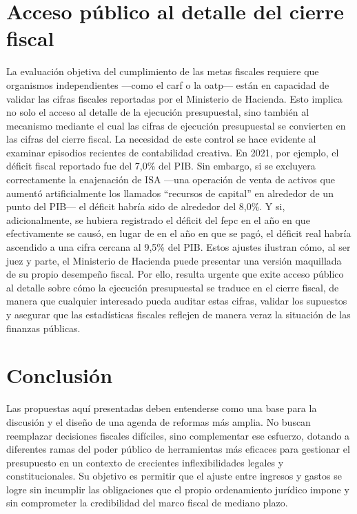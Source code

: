 \section{Acceso público al detalle del cierre fiscal}

La evaluación objetiva del cumplimiento de las metas fiscales requiere que organismos independientes —como el \gls{carf} o la \gls{oatp}— están en capacidad de validar las cifras fiscales reportadas por el Ministerio de Hacienda. Esto implica no solo el acceso al detalle de la ejecución presupuestal, sino también al mecanismo mediante el cual las cifras de ejecución presupuestal se convierten en las cifras del cierre fiscal. La necesidad de este control se hace evidente al examinar episodios recientes de contabilidad creativa. En 2021, por ejemplo, el déficit fiscal reportado fue del 7,0\% del PIB. Sin embargo, si se excluyera correctamente la enajenación de ISA —una operación de venta de activos que aumentó artificialmente los llamados ``recursos de capital'' en alrededor de un punto del PIB— el déficit habría sido de alrededor del 8,0\%. Y si, adicionalmente, se hubiera registrado el déficit del \gls{fepc} en el año en que efectivamente se causó, en lugar de en el año en que se pagó, el déficit real habría ascendido a una cifra cercana al 9,5\% del PIB. Estos ajustes ilustran cómo, al ser juez y parte, el Ministerio de Hacienda puede presentar una versión maquillada de su propio desempeño fiscal. Por ello, resulta urgente que exite acceso público al detalle sobre cómo la ejecución presupuestal se traduce en el cierre fiscal, de manera que cualquier interesado pueda auditar estas cifras, validar los supuestos y asegurar que las estadísticas fiscales reflejen de manera veraz la situación de las finanzas públicas.

\section{Conclusión}

Las propuestas aquí presentadas deben entenderse como una base para la discusión y el diseño de una agenda de reformas más amplia. No buscan reemplazar decisiones fiscales difíciles, sino complementar ese esfuerzo, dotando a diferentes ramas del poder público de herramientas más eficaces para gestionar el presupuesto en un contexto de crecientes inflexibilidades legales y constitucionales. Su objetivo es permitir que el ajuste entre ingresos y gastos se logre sin incumplir las obligaciones que el propio ordenamiento jurídico impone y sin comprometer la credibilidad del marco fiscal de mediano plazo.

